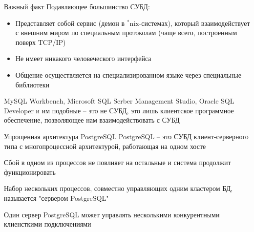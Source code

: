 \documentclass[12pt]{article}
\begin{document}
\begin{Remark}{Важный факт}
    Подавляющее большинство СУБД:

    \begin{itemize}
        \item Представляет собой сервис (демон в $^*$nix-системах), который взаимодействует с внешним миром по специальным протоколам (чаще всего, построенным поверх TCP/IP)
        \item Не имеет никакого человеческого интерфейса
        \item Общение осуществляется на специализированном языке через специальные библиотеки
    \end{itemize}

    MySQL Workbench, Microsoft SQL Serber Management Studio, Oracle SQL Developer и им подобные -- это не СУБД, это лишь клиентское программное обеспечение, позволяющее нам взаимодействовать с СУБД
\end{Remark}

\begin{nota}{Упрощенная архитектура PostgreSQL}
    PostgreSQL -- это СУБД клиент-серверного типа с многопроцессной архитектурой, работающая на одном хосте 

    Сбой в одном из процессов не повлияет на остальные и система продолжит функционировать 

    Набор нескольких процессов, совместно управляющих одним кластером БД, называется "сервером PostgreSQL"\

    Один сервер PostgreSQL может управлять несколькими конкурентными клиенсткими подключениями 
\end{nota}
\end{document}
